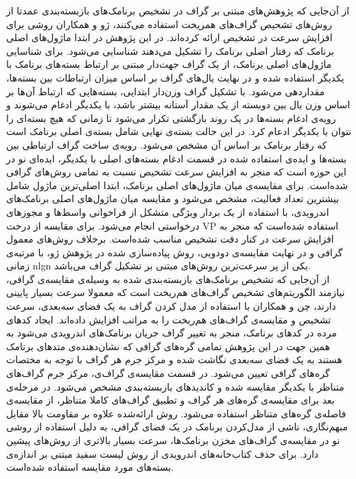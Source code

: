از آن‌جایی که پژوهش‌های مبتنی بر گراف در تشخیص برنامک‌های بازبسته‌بندی عمدتا از روش‌های تشحیص گراف‌های همریخت استفاده می‌کنند، ژو و همکاران  روشی برای افزایش سرعت در تشخیص ارائه کرده‌اند. در این پژوهش در ابتدا ماژول‌های اصلی برنامک که رفتار اصلی برنامک را تشکیل می‌دهند شناسایی می‌شود. برای شناسایی ماژول‌های اصلی برنامک، از یک گراف جهت‌دار مبتنی بر ارتباط بسته‌های برنامک با یکدیگر استفاده شده و در نهایت یال‌های گراف بر اساس میزان ارتباطات بین بسته‌ها، مقدار‌دهی می‌شود. با تشکیل گراف وزن‌دار ابتدایی، بسته‌هایی که ارتباط آن‌ها بر اساس وزن یال بین دو‌بسته از یک مقدار آستانه بیشتر باشد، با یکدیگر ادغام می‌شوند و رویه‌ی ادغام بسته‌ها در یک روند بازگشتی تکرار می‌شود تا زمانی که هیچ بسته‌ای را نتوان با یکدیگر ادعام کرد. در این حالت بسته‌ی نهایی شامل بسته‌ی اصلی برنامک است که رفتار برنامک بر اساس آن مشخص می‌شود. رویه‌ی ساخت گراف ارتباطی بین بسته‌‌ها و ایده‌ی استفاده شده در قسمت ادغام بسته‌های اصلی با یکدیگر، ایده‌ای نو در این حوزه‌ است که منجر به افزایش سرعت تشخیص نسبت به تمامی روش‌های گرافی شده‌است. برای مقایسه‌ی میان ماژول‌های اصلی برنامک، ابتدا اصلی‌ترین ماژول شامل بیشترین تعداد فعالیت، مشخص می‌شود و مقایسه میان ماژول‌های اصلی برنامک‌های اندرویدی،‌ با استفاده از یک بردار ویژگی متشکل از فراخوانی‌ واسط‌ها و مجوز‌های درخواستی انجام می‌شود. برای مقایسه از درخت VP استفاده شده‌است که منجر به افزایش سرعت در کنار دقت تشخیص مناسب شده‌است. برخلاف روش‌های معمول گرافی و در نهایت مقایسه‌ی دو‌دویی، روش پیاده‌سازی شده در پژوهش ژو، با مرتبه‌ی زمانی nlgn یکی از پر سرعت‌ترین روش‌های مبتنی بر تشکیل گراف می‌باشد.\\
از آن‌جایی که تشخیص برنامک‌های بازبسته‌بندی شده به وسیله‌ی مقایسه‌ی گرافی، نیازمند الگوریتم‌های تشخیص گراف‌های هم‌ریخت است که معمولا سرعت بسیار پایینی دارند، چن و همکاران با استفاده از مدل کردن گراف به یک فضای سه‌بعدی، سرعت تشخیص و مقایسه‌ی گراف‌های هم‌ریخت را به مراتب افزایش داده‌اند. ایجاد کد‌های مرده در کد‌های برنامک، منجر به تغییر گراف‌ جریان برنامک‌های اندرویدی می‌شود به همین جهت در این پژوهش تمامی گره‌های گرافی که نشان‌دهنده‌ی متد‌های برنامک هستند به یک فضای سه‌بعدی نگاشت شده و مرکز جرم هر گراف با توجه به مختصات گره‌های گرافی تعیین می‌شود. در قسمت مقایسه‌ی گراف‌ی، مرکز جرم گراف‌‌های متناظر با یکدیگر مقایسه شده و کاندید‌های بازبسته‌بندی مشخص می‌شود. در مرحله‌ی بعد برای مقایسه‌ی گره‌های هر گراف و تطبیق گراف‌های کاملا متناظر، از مقایسه‌ی فاصله‌ی گره‌های متناظر استفاده می‌شود. روش ارائه‌شده علاوه بر مقاومت بالا مقابل مبهم‌نگاری، ناشی از مدل‌کردن برنامک در یک فضای گرافی، به دلیل استفاده از روشی نو در مقایسه‌ی گراف‌های مخزن برنامک‌ها، سرعت بسیار بالاتری از روش‌های پیشین دارد. برای حذف کتاب‌خانه‌های اندرویدی از روش لیست سفید مبتنی بر اندازه‌ی بسته‌های مورد مقایسه استفاده شده‌است. 
